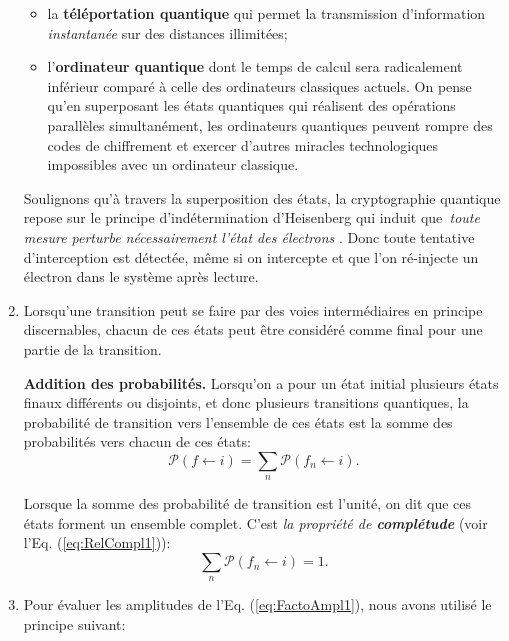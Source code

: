 \begin{enumerate}
\begin{itemize}
\item la \textbf{téléportation quantique} qui permet la transmission
d'information \emph{instantanée} sur des distances illimitées;

\item l'\textbf{ordinateur quantique} dont le temps de calcul sera
radicalement inférieur comparé à celle des ordinateurs classiques actuels. On
pense qu'en superposant les états quantiques qui réalisent des opérations
parallèles simultanément, les ordinateurs quantiques peuvent rompre des codes
de chiffrement et exercer d'autres miracles technologiques impossibles avec un
ordinateur classique.
\end{itemize}

Soulignons qu'à travers la superposition des états, la cryptographie
quantique repose sur le principe d'indétermination d'Heisenberg qui induit
que\emph{\ toute mesure perturbe nécessairement l'état des électrons }. Donc
toute tentative d'interception est détectée, même si on intercepte et que l'on
ré-injecte un électron dans le système après lecture.

\item Lorsqu'une transition peut se faire par des voies intermédiaires en
principe discernables, chacun de ces états peut être considéré comme final
pour une partie de la transition.

\colorbox[gray]{0.8}{
\parbox[c]{0.9\textwidth}{
\begin{principe}
\textbf{Addition des probabilités.} Lorsqu'on a pour un état initial plusieurs
états finaux différents ou disjoints, et donc plusieurs transitions quantiques,
la probabilité de transition vers l'ensemble de ces états est  la somme des
probabilités vers chacun de ces états:
\begin{equation}
\mathcal{P}(f\leftarrow i)=\sum_{n}\mathcal{P}(f_{n}\leftarrow i).
\end{equation}
\end{principe}
}}

Lorsque la somme des probabilité de transition est l'unité, on dit que ces
états forment un ensemble complet. C'est \emph{la propriété de
\textbf{complétude}} (voir l'Eq. (\ref{eq:RelCompl1})):%
\begin{equation}
\sum_{n}\mathcal{P}(f_{n}\leftarrow i)=1.
\end{equation}


\item Pour évaluer les amplitudes de l'Eq. (\ref{eq:FactoAmpl1}), nous avons
utilisé le principe suivant:


\end{enumerate}
